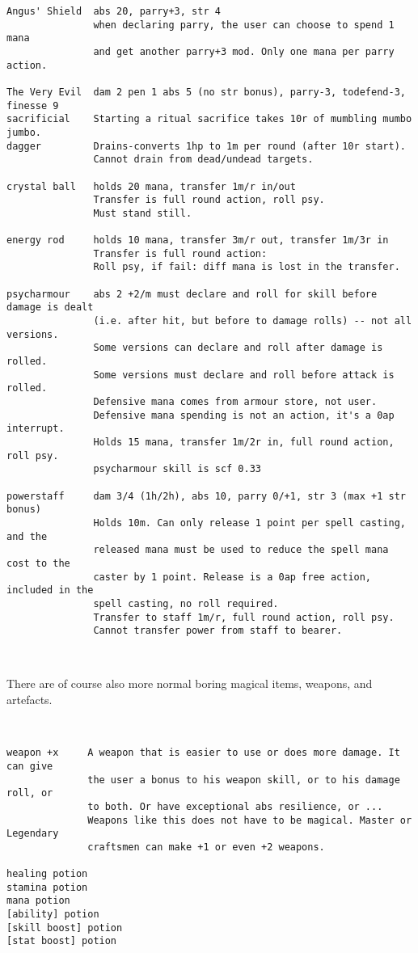 \begin{verbatim}
Angus' Shield  abs 20, parry+3, str 4
               when declaring parry, the user can choose to spend 1 mana
               and get another parry+3 mod. Only one mana per parry action.

The Very Evil  dam 2 pen 1 abs 5 (no str bonus), parry-3, todefend-3, finesse 9
sacrificial    Starting a ritual sacrifice takes 10r of mumbling mumbo jumbo.
dagger         Drains-converts 1hp to 1m per round (after 10r start).
               Cannot drain from dead/undead targets.

crystal ball   holds 20 mana, transfer 1m/r in/out
               Transfer is full round action, roll psy.
               Must stand still.

energy rod     holds 10 mana, transfer 3m/r out, transfer 1m/3r in
               Transfer is full round action:
               Roll psy, if fail: diff mana is lost in the transfer.

psycharmour    abs 2 +2/m must declare and roll for skill before damage is dealt
               (i.e. after hit, but before to damage rolls) -- not all versions.
               Some versions can declare and roll after damage is rolled.
               Some versions must declare and roll before attack is rolled.
               Defensive mana comes from armour store, not user.
               Defensive mana spending is not an action, it's a 0ap interrupt.
               Holds 15 mana, transfer 1m/2r in, full round action, roll psy.
               psycharmour skill is scf 0.33

powerstaff     dam 3/4 (1h/2h), abs 10, parry 0/+1, str 3 (max +1 str bonus)
               Holds 10m. Can only release 1 point per spell casting, and the
               released mana must be used to reduce the spell mana cost to the
               caster by 1 point. Release is a 0ap free action, included in the
               spell casting, no roll required.
               Transfer to staff 1m/r, full round action, roll psy.
               Cannot transfer power from staff to bearer.
\end{verbatim} \normalsize

\

There are of course also more normal boring magical items, weapons, and artefacts.

\

\small \begin{verbatim}
weapon +x     A weapon that is easier to use or does more damage. It can give
              the user a bonus to his weapon skill, or to his damage roll, or
              to both. Or have exceptional abs resilience, or ...
              Weapons like this does not have to be magical. Master or Legendary
              craftsmen can make +1 or even +2 weapons.

healing potion
stamina potion
mana potion
[ability] potion
[skill boost] potion
[stat boost] potion
\end{verbatim} \normalsize







